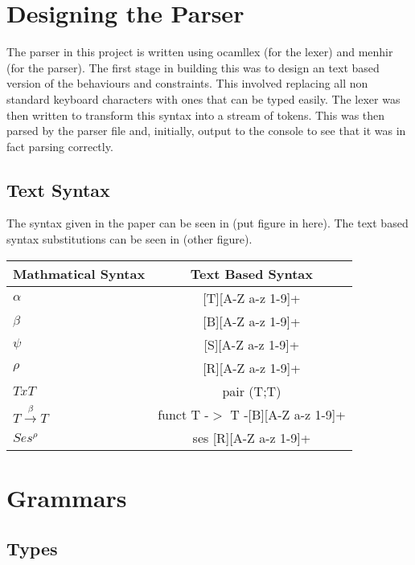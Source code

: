 \documentclass[12pt]{article}
\begin{document}
\maketitle

\section {Designing the Parser}

The parser in this project is written using ocamllex (for the lexer) and menhir (for the parser). The first stage in building this was to design an text based version of the behaviours and constraints. This involved replacing all non standard keyboard characters with ones that can be typed easily. The lexer was then written to transform this syntax into a stream of tokens. This was then parsed by the parser file and, initially, output to the console to see that it was in fact parsing correctly. 

\subsection{Text Syntax}

The syntax given in the paper can be seen in (put figure in here). The text based syntax substitutions can be seen in (other figure). 

\begin{tabular}{l c }
Mathmatical Syntax & Text Based Syntax \\
\hline
$\alpha$ & [T][A-Z a-z 1-9]+ \\
$\beta$ & [B][A-Z a-z 1-9]+ \\
$\psi$ & [S][A-Z a-z 1-9]+ \\
$\rho$ & [R][A-Z a-z 1-9]+ \\
$T x T$ & pair (T;T) \\
$ T\overset{\beta}{\rightarrow}T $ & funct T -$>$ T -[B][A-Z a-z 1-9]+ \\
$Ses^\rho$ & ses [R][A-Z a-z 1-9]+ \\


\end{tabular}

\section {Grammars}

\subsection{Types}
\end{document}
